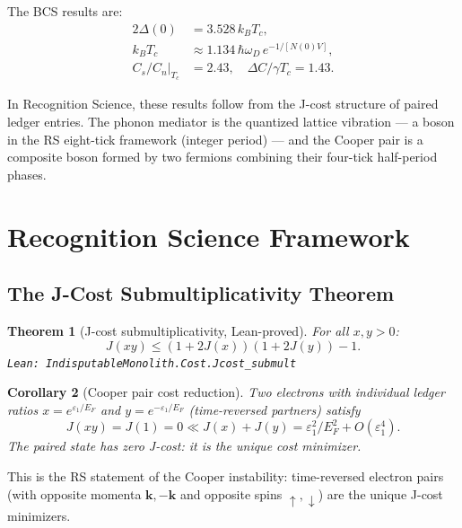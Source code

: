 \documentclass[12pt,a4paper]{article}
\newtheorem{theorem}{Theorem}[section]
\newtheorem{corollary}[theorem]{Corollary}
\theoremstyle{definition}
\theoremstyle{remark}
\begin{document}
The BCS results are:
\begin{align}
  2\Delta(0) &= 3.528\,k_B T_c, \label{eq:gap_ratio} \\
  k_B T_c &\approx 1.134\,\hbar\omega_D\,e^{-1/[N(0)V]},
  \label{eq:tc_bcs} \\
  C_s/C_n|_{T_c} &= 2.43, \quad \Delta C/\gamma T_c = 1.43.
  \label{eq:jump}
\end{align}

In Recognition Science, these results follow from the J-cost structure
of paired ledger entries.  The phonon mediator is the quantized
lattice vibration — a boson in the RS eight-tick framework (integer
period) — and the Cooper pair is a composite boson formed by two
fermions combining their four-tick half-period phases.

\section{Recognition Science Framework}
\label{sec:rs}

\subsection{The J-Cost Submultiplicativity Theorem}

\begin{theorem}[J-cost submultiplicativity, Lean-proved]\label{thm:submult}
For all $x, y > 0$:
\begin{equation}
  J(xy) \leq (1 + 2J(x))(1 + 2J(y)) - 1.
\end{equation}
\texttt{Lean: IndisputableMonolith.Cost.Jcost\_submult}
\end{theorem}

\begin{corollary}[Cooper pair cost reduction]\label{cor:cooper}
Two electrons with individual ledger ratios $x = e^{\varepsilon_1/E_F}$
and $y = e^{-\varepsilon_1/E_F}$ (time-reversed partners) satisfy
\begin{equation}
  J(xy) = J(1) = 0 \ll J(x) + J(y) = \varepsilon_1^2/E_F^2 + O(\varepsilon_1^4).
\end{equation}
The paired state has \emph{zero} J-cost: it is the unique cost minimizer.
\end{corollary}

This is the RS statement of the Cooper instability: time-reversed
electron pairs (with opposite momenta $\mathbf{k}, -\mathbf{k}$ and
opposite spins $\uparrow, \downarrow$) are the unique J-cost minimizers.
\end{document}
